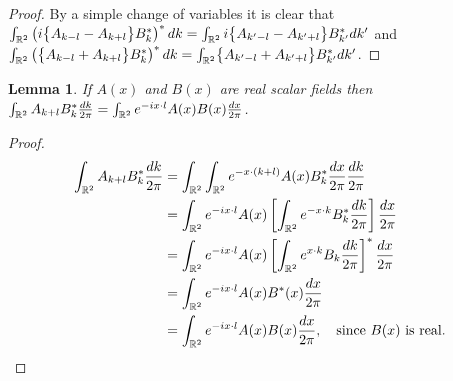 \documentclass[noinfoline]{imsart}
\newtheorem{lemma}{Lemma}
\begin{document}
\begin{proof}
By a simple change of variables it is clear that 
$\int_{\Bbb R^2} \left(i\bigl\{ A_{k-l}  -   A_{k+l}  \bigr\} B^*_k\right)^* dk = \int_{\Bbb R^2} i\bigl\{ A_{k^\prime-l} - A_{k^\prime+l}  \bigr\} B_{k^\prime}^* dk^\prime$ and $\int_{\Bbb R^2} \left(\bigl\{  A_{k-l}  +    A_{k+l}   \bigr\} B^*_k \right)^* dk  = \int_{\Bbb R^2} \bigl\{ A_{k^\prime-l} + A_{k^\prime+l}  \bigr\} B_{k^\prime}^* dk^\prime$.


\end{proof}



\begin{lemma} 
\label{conv}
If $A(x)$ and $B(x)$ are real scalar fields then  $\int_{\Bbb R^2} A_{k+l}  B^*_k \frac{dk}{2\pi}= \int_{\Bbb R^2} e^{-ix\cdot l} A(x)B(x)\frac{dx}{2\pi}$.
\end{lemma}

\begin{proof} 
\begin{align*}
\int_{\Bbb R^2} A_{k+l}  B^*_k \frac{dk}{2\pi} 
& = \int_{\Bbb R^2} \int_{\Bbb R^2} e^{-x\cdot (k+l)} A(x) B_{k}^*  \frac{dx}{2\pi}   \frac{dk}{2\pi} \\
& = \int_{\Bbb R^2}e^{-ix\cdot l} A(x) \left[\int_{\Bbb R^2} e^{-x\cdot k} B_{k}^*     \frac{dk}{2\pi}\right] \frac{dx}{2\pi}\\
& = \int_{\Bbb R^2}e^{-ix\cdot l} A(x) \left[\int_{\Bbb R^2} e^{x\cdot k} B_{k}     \frac{dk}{2\pi}\right]^* \frac{dx}{2\pi}\\
&= \int_{\Bbb R^2} e^{-ix\cdot l} A(x)B^*(x)\frac{dx}{2\pi}\\
&= \int_{\Bbb R^2} e^{-ix\cdot l} A(x)B(x)\frac{dx}{2\pi},\quad\text{since $B(x)$ is real.}
\end{align*}

\end{proof}
\end{document}
